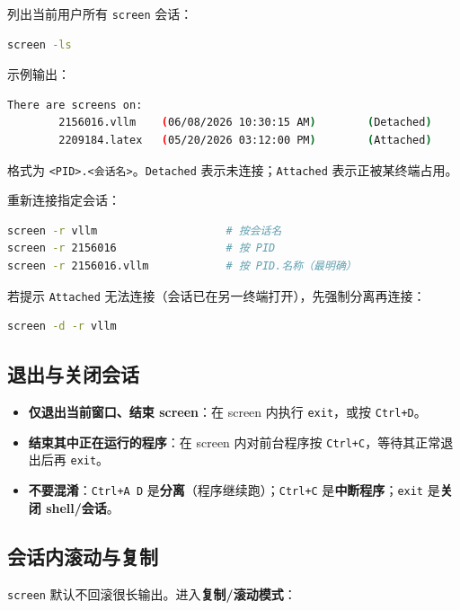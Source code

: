 列出当前用户所有 \texttt{screen} 会话：

\begin{lstlisting}[language=sh]
screen -ls
\end{lstlisting}

示例输出：

\begin{lstlisting}[language=sh]
There are screens on:
        2156016.vllm    (06/08/2026 10:30:15 AM)        (Detached)
        2209184.latex   (05/20/2026 03:12:00 PM)        (Attached)
\end{lstlisting}

格式为 \texttt{<PID>.<会话名>}。\texttt{Detached} 表示未连接；\texttt{Attached} 表示正被某终端占用。

重新连接指定会话：

\begin{lstlisting}[language=sh]
screen -r vllm                    # 按会话名
screen -r 2156016                 # 按 PID
screen -r 2156016.vllm            # 按 PID.名称（最明确）
\end{lstlisting}

若提示 \texttt{Attached} 无法连接（会话已在另一终端打开），先强制分离再连接：

\begin{lstlisting}[language=sh]
screen -d -r vllm
\end{lstlisting}

\subsection{退出与关闭会话}

\begin{itemize}
    \item \textbf{仅退出当前窗口、结束 screen}：在 screen 内执行 \texttt{exit}，或按 \texttt{Ctrl+D}。
    \item \textbf{结束其中正在运行的程序}：在 screen 内对前台程序按 \texttt{Ctrl+C}，等待其正常退出后再 \texttt{exit}。
    \item \textbf{不要混淆}：\texttt{Ctrl+A D} 是\textbf{分离}（程序继续跑）；\texttt{Ctrl+C} 是\textbf{中断程序}；\texttt{exit} 是\textbf{关闭 shell/会话}。
\end{itemize}

\subsection{会话内滚动与复制}

\texttt{screen} 默认不回滚很长输出。进入\textbf{复制/滚动模式}：

